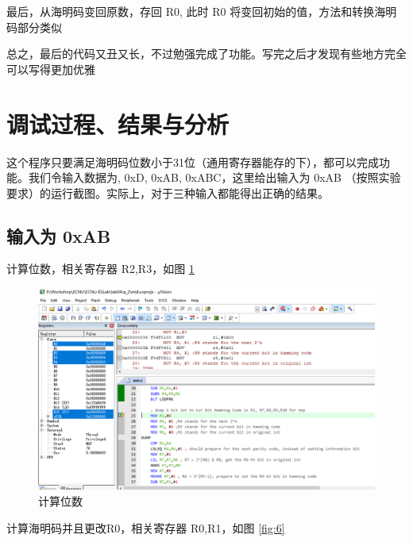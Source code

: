 \documentclass[a4paper,10pt,UTF8]{paper}
\numberwithin{equation}{section}
\numberwithin{figure}{section}
\begin{document}
最后，从海明码变回原数，存回 R0, 此时 R0 将变回初始的值，方法和转换海明码部分类似


总之，最后的代码又丑又长，不过勉强完成了功能。写完之后才发现有些地方完全可以写得更加优雅


\section{调试过程、结果与分析}

这个程序只要满足海明码位数小于31位（通用寄存器能存的下），都可以完成功能。我们令输入数据为, 0xD, 0xAB, 0xABC，这里给出输入为 0xAB （按照实验要求）的运行截图。实际上，对于三种输入都能得出正确的结果。

\subsection{输入为 0xAB}


计算位数，相关寄存器 R2,R3，如图 \ref{fig:5}

\begin{figure}[h]
  \centering
  \includegraphics[width=0.9\linewidth]{1.PNG}
  \caption{计算位数}
  \label{fig:5}
\end{figure}

计算海明码并且更改R0，相关寄存器 R0,R1，如图 \ref{fig:6}
\end{document}
